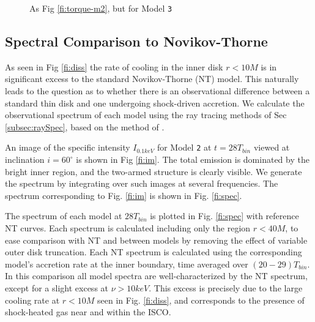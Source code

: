 \documentclass{emulateapj}
\newcommand{\model}[1]{{Model \texttt{#1}}}
\begin{document}
\begin{figure}
	\caption{\label{fi:torque-m4} As Fig \ref{fi:torque-m2}, but for \model{3}}  
\end{figure}

\subsection{Spectral Comparison to Novikov-Thorne}
\label{subsec:spectra}

As seen in Fig \ref{fi:diss} the rate of cooling in the inner disk $r < 10M$ is in significant excess to the standard Novikov-Thorne (NT) model.  This naturally leads to the question as to whether there is an observational difference between a standard thin disk and one undergoing shock-driven accretion.  We calculate the observational spectrum of each model using the ray tracing methods of Sec \ref{subsec:raySpec}, based on the method of \cite{Kulkarni11}.

\begin{figure*}
	\caption{\label{fi:im} Ray-traced image of \model{2} at $\nu =   1keV$. Shocks are clearly visible even near the black hole's shadow.  Relativistic beaming increases the intensity of observed emission in material with velocities towards the observer.}
\end{figure*}

An image of the specific intensity $I_{0.1keV}$ for \model{2} at $t=28 T_{bin}$ viewed at inclination $i=60^\circ$ is shown in Fig \ref{fi:im}.  The total emission is dominated by the bright inner region, and the two-armed structure is clearly visible. We generate the spectrum by integrating over such images at several frequencies.  The spectrum corresponding to Fig. \ref{fi:im} is shown in Fig. \ref{fi:spec}. 

The spectrum of each model at $28 T_{bin}$ is plotted in Fig. \ref{fi:spec} with reference NT curves.  Each spectrum is calculated including only the region $r<40M$, to ease comparison with NT and between models by removing the effect of variable outer disk truncation.  Each NT spectrum is calculated using the corresponding model's accretion rate at the inner boundary, time averaged over $(20-29)T_{bin}$.  In this comparison all model spectra are well-characterized by the NT spectrum, except for a slight excess at $\nu > 10keV$.  This excess is precisely due to the large cooling rate at $r<10M$ seen in Fig. \ref{fi:diss}, and corresponds to the presence of shock-heated gas near and within the ISCO.  
\end{document}

